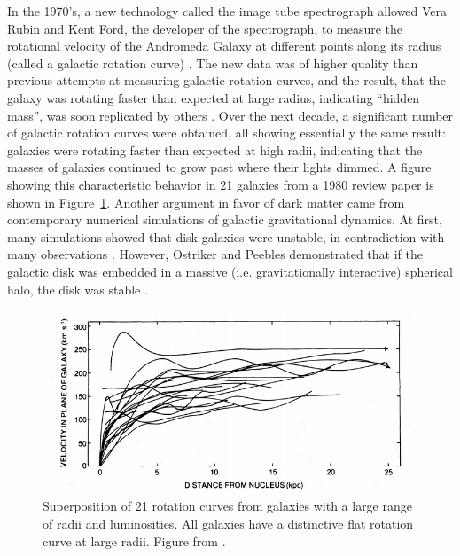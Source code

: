 In the 1970's, a new technology called the image tube spectrograph allowed Vera Rubin and Kent Ford, the developer of the spectrograph, to measure the rotational velocity of the Andromeda Galaxy at different points along its radius (called a galactic rotation curve) \cite{Rubin1970}. The new data was of higher quality than previous attempts at measuring galactic rotation curves, and the result, that the galaxy was rotating faster than expected at large radius, indicating ``hidden mass'', was soon replicated by others \cite{Bertone2016}. Over the next decade, a significant number of galactic rotation curves were obtained, all showing essentially the same result: galaxies were rotating faster than expected at high radii, indicating that the masses of galaxies continued to grow past where their lights dimmed. A figure showing this characteristic behavior in 21 galaxies from a 1980 review paper \cite{Rubin1980} is shown in Figure~\ref{fig:curves}. Another argument in favor of dark matter came from contemporary numerical simulations of galactic gravitational dynamics. At first, many simulations showed that disk galaxies were unstable, in contradiction with many observations \cite{Bertone2016}. However, Ostriker and Peebles demonstrated that if the galactic disk was embedded in a massive (i.e. gravitationally interactive) spherical halo, the disk was stable \cite{Peebles1973}.

\begin{figure}[htbp]
\begin{center}
\includegraphics[width=\textwidth]{figures/theory/rot_curves.png}
\caption{Superposition of 21 rotation curves from galaxies with a large range of radii and luminosities. All galaxies have a distinctive flat rotation curve at large radii. Figure from \cite{Rubin1980}.}
\label{fig:curves}
\end{center}
\end{figure}



